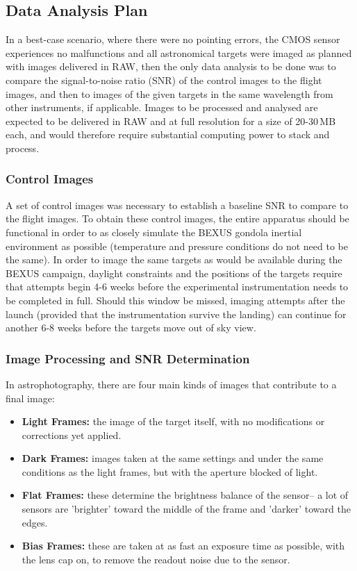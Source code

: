 \subsection{Data Analysis Plan}

In a best-case scenario, where there were no pointing errors, the CMOS sensor experiences no malfunctions and all astronomical targets were imaged as planned with images delivered in RAW, then the only data analysis to be done was to compare the signal-to-noise ratio (SNR) of the control images to the flight images, and then to images of the given targets in the same wavelength from other instruments, if applicable.  Images to be processed and analysed are expected to be delivered in RAW and at full resolution for a size of 20-30\,MB each, and would therefore require substantial computing power to stack and process.

\subsubsection{Control Images}

A set of control images was necessary to establish a baseline SNR to compare to the flight images. To obtain these control images, the entire apparatus should be functional in order to as closely simulate the BEXUS gondola inertial environment as possible (temperature and pressure conditions do not need to be the same). In order to image the same targets as would be available during the BEXUS campaign, daylight constraints and the positions of the targets require that attempts begin 4-6 weeks before the experimental instrumentation needs to be completed in full. Should this window be missed, imaging attempts after the launch (provided that the instrumentation survive the landing) can continue for another 6-8 weeks before the targets move out of sky view.

\subsubsection{Image Processing and SNR Determination}

In astrophotography, there are four main kinds of images that contribute to a final image:
\begin{itemize}
    \item \textbf{Light Frames:} the image of the target itself, with no modifications or corrections yet applied.
    \item \textbf{Dark Frames:} images taken at the same settings and under the same conditions as the light frames, but with the aperture blocked of light.
    \item \textbf{Flat Frames:} these determine the brightness balance of the sensor-- a lot of sensors are 'brighter' toward the middle of the frame and 'darker' toward the edges.
    \item \textbf{Bias Frames:} these are taken at as fast an exposure time as possible, with the lens cap on, to remove the readout noise due to the sensor.
\end{itemize}

